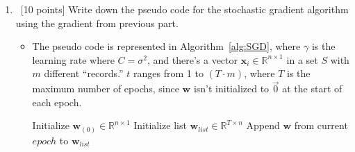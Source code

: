 \begin{enumerate}
\begin{itemize}
\begin{align}
J(\mathbf{w}) &= \sum_{i=1}^{n}\log\P{1+\exp(-y_{i}\mathbf{w}^{T}\mathbf{x}_{i})}+\frac{\mathbf{w}^{T}\mathbf{w}}{\sigma^{2}}\\
&= \sum_{i=1}^{n}\log\P{1+\exp(-y_{i}\mathbf{w}^{T}\mathbf{x}_{i})}+\frac{\left|\left|\mathbf{w}\right|\right|^{2}}{\sigma^{2}}\\
\intertext{where we can take the derivative of this with respect to $\mathbf{w}$ and drop the summation since we're treating each record as the {\em only} data point. The first term is the same as the result in Equation~(\ref{eq:expo}) so only the second term needs to be differentiated with respect to $\mathbf{w}$.}
\frac{\partial J(\mathbf{w})}{\partial \mathbf{w}}&= \frac{-y_{1}\mathbf{x}_{1}}{\exp(y_{1}\mathbf{w}^{T}\mathbf{x}_{1})+1} + 2\frac{\left|\left|\mathbf{w}\right|\right|}{\sigma^{2}}\label{eq:grad-J}
\end{align}
\end{itemize}

\item ~[10 points] Write down the pseudo code for the stochastic gradient algorithm using the gradient from previous part.

\begin{itemize}
\item The pseudo code is represented in Algorithm~\ref{alg:SGD}, where $\gamma$ is the learning rate where $C=\sigma^{2}$, and there's a vector $\mathbf{x}_{i}\in\mathbb{R}^{n\times 1}$ in a set $S$ with $m$ different ``records.'' $t$ ranges from 1 to $(T\cdot m)$, where $T$ is the maximum number of epochs, since $\mathbf{w}$ isn't initialized to $\vec{0}$ at the start of each epoch.
\begin{algorithm} %
\begin{algorithmic}%
\STATE Initialize $\mathbf{w}_{(0)}\in\mathbb{R}^{n\times 1}$
\STATE Initialize list $\mathbf{w}_{list}\in\mathbb{R}^{T\times n}$
\ENDFOR
\STATE Append $\mathbf{w}$ from current $epoch$ to $\mathbf{w}_{list}$
\ENDFOR
{}
\end{algorithmic}
\caption{Stochastic Gradient Descent$(S=\{(\mathbf{x}_{i},y_{i})\}_{m})$}
\label{alg:SGD}
\end{algorithm}
\end{itemize}



\end{enumerate}
